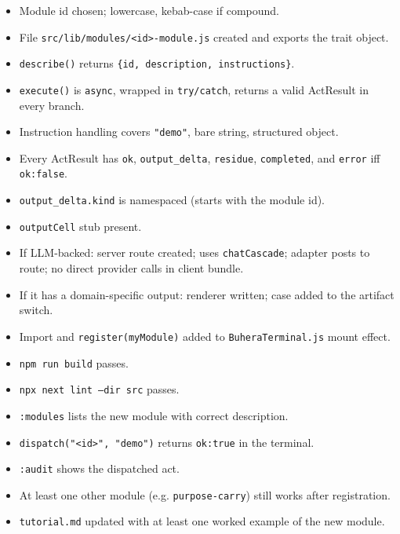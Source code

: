 \documentclass[11pt,a4paper]{article}
\theoremstyle{contract}
\begin{document}
\begin{itemize}[leftmargin=1.6em,itemsep=1pt]
\item[$\square$] Module id chosen; lowercase, kebab-case if compound.
\item[$\square$] File \texttt{src/lib/modules/<id>-module.js} created and exports the trait object.
\item[$\square$] \texttt{describe()} returns \texttt{\{id, description, instructions\}}.
\item[$\square$] \texttt{execute()} is \texttt{async}, wrapped in \texttt{try/catch}, returns a valid ActResult in every branch.
\item[$\square$] Instruction handling covers \texttt{"demo"}, bare string, structured object.
\item[$\square$] Every ActResult has \texttt{ok}, \texttt{output\_delta}, \texttt{residue}, \texttt{completed}, and \texttt{error} iff \texttt{ok:false}.
\item[$\square$] \texttt{output\_delta.kind} is namespaced (starts with the module id).
\item[$\square$] \texttt{outputCell} stub present.
\item[$\square$] If LLM-backed: server route created; uses \texttt{chatCascade}; adapter posts to route; no direct provider calls in client bundle.
\item[$\square$] If it has a domain-specific output: renderer written; case added to the artifact switch.
\item[$\square$] Import and \texttt{register(myModule)} added to \texttt{BuheraTerminal.js} mount effect.
\item[$\square$] \texttt{npm run build} passes.
\item[$\square$] \texttt{npx next lint --dir src} passes.
\item[$\square$] \texttt{:modules} lists the new module with correct description.
\item[$\square$] \texttt{dispatch("<id>", "demo")} returns \texttt{ok:true} in the terminal.
\item[$\square$] \texttt{:audit} shows the dispatched act.
\item[$\square$] At least one other module (e.g. \texttt{purpose-carry}) still works after registration.
\item[$\square$] \texttt{tutorial.md} updated with at least one worked example of the new module.
\end{itemize}

\end{document}
